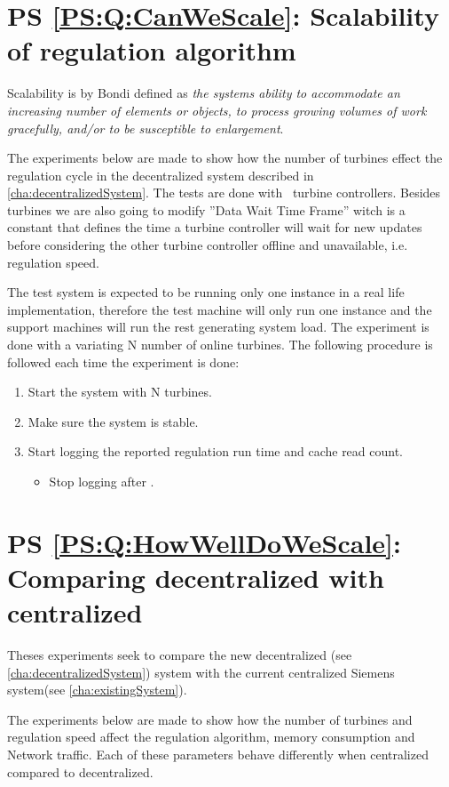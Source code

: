 \section{PS \ref{PS:Q:CanWeScale}: Scalability of regulation algorithm}
Scalability is by Bondi\cite{Bondi:2000:CSI:350391.350432} defined as \textit{the systems ability to accommodate an increasing number of elements or objects, to process growing volumes of work gracefully, and/or to be susceptible to enlargement}.

The experiments below are made to show how the number of turbines effect the regulation cycle in the decentralized system described in \cref{cha:decentralizedSystem}.
The tests are done with \testTurbineNumbers ~turbine controllers. Besides turbines we are also going to modify ''Data Wait Time Frame'' witch is a constant that defines the time a turbine controller will wait for new updates before considering the other turbine controller offline and unavailable, i.e. regulation speed.

The test system is expected to be running only one instance in a real life implementation, therefore the test machine will only run one instance and the support machines will run the rest generating system load.
The experiment is done with a variating N number of online turbines.
The following procedure is followed each time the experiment is done:
\begin{enumerate}
	\item Start the system with N turbines.
	\item Make sure the system is stable.
	\item Start logging the reported regulation run time and cache read count.
	\begin{itemize}
		\item Stop logging after \experiemntRunTime.
	\end{itemize}
\end{enumerate}

\section{PS \ref{PS:Q:HowWellDoWeScale}: Comparing decentralized with centralized}
Theses experiments seek to compare the new decentralized (see \cref{cha:decentralizedSystem}) system with the current centralized Siemens system(see \cref{cha:existingSystem}).

The experiments below are made to show how the number of turbines and regulation speed affect the regulation algorithm, memory consumption and Network traffic.
Each of these parameters behave differently when centralized compared to decentralized.

